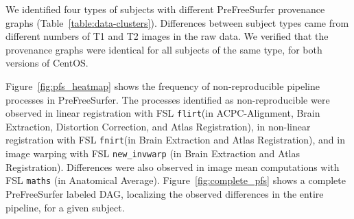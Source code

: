 \documentclass[a4paper,num-refs]{oup-contemporary}
\newcommand{\flirt}[0]{\texttt{flirt}\xspace}
\newcommand{\fnirt}[0]{\texttt{fnirt}\xspace}
\begin{document}
We identified four types of subjects with different PreFreeSurfer
provenance graphs (Table~\ref{table:data-clusters}). Differences between
subject types came from different numbers of T1 and T2 images in the
raw data. We verified that
the provenance graphs were identical for all subjects of the same type, for
both versions of CentOS.

Figure~\ref{fig:pfs_heatmap} shows the frequency of non-reproducible pipeline processes
in PreFreeSurfer. 
The processes identified as non-reproducible were observed in linear registration 
with FSL \flirt (in ACPC-Alignment, Brain Extraction, Distortion Correction, and
Atlas Registration), in non-linear registration with FSL \fnirt (in Brain Extraction 
and Atlas Registration), and in image warping with FSL \texttt{new\_invwarp} (in Brain Extraction 
and Atlas Registration). Differences were also observed in image mean 
computations with FSL \texttt{maths}  (in Anatomical Average). 
Figure~\ref{fig:complete_pfs} shows a complete PreFreeSurfer labeled DAG, localizing 
the observed differences in the entire pipeline, for a given subject.
\end{document}
